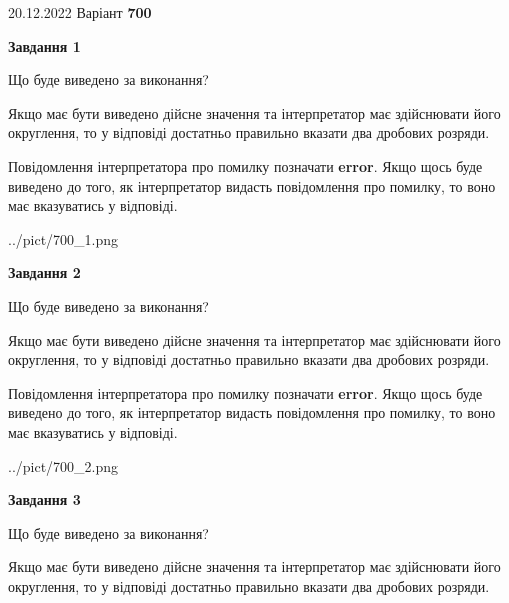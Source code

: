 \documentclass[12pt, ukrainian]{article}
\begin{document}
{20.12.2022 Варіант \No \textbf { 700 }\par}
{
\begin {Large}

{\begin {center}\textbf{Завдання 1}\end {center}}\par
Що буде виведено за виконання? \par

Якщо має бути виведено дійсне значення та інтерпретатор має здійснювати його округлення, 
то у відповіді достатньо правильно вказати два дробових розряди.

Повідомлення інтерпретатора про помилку позначати \textbf{error}.
Якщо щось буде виведено до того, як інтерпретатор видасть повідомлення про помилку, 
то воно має вказуватись у відповіді. \par

\begin{center}
	{../pict/700_1.png}
\end{center}
\newpage

{\begin {center}\textbf{Завдання 2}\end {center}}\par
Що буде виведено за виконання? \par

Якщо має бути виведено дійсне значення та інтерпретатор має здійснювати його округлення, 
то у відповіді достатньо правильно вказати два дробових розряди.

Повідомлення інтерпретатора про помилку позначати \textbf{error}.
Якщо щось буде виведено до того, як інтерпретатор видасть повідомлення про помилку, 
то воно має вказуватись у відповіді. \par

\begin{center}
	{../pict/700_2.png}
\end{center}
\newpage

{\begin {center}\textbf{Завдання 3}\end {center}}\par
Що буде виведено за виконання? \par

Якщо має бути виведено дійсне значення та інтерпретатор має здійснювати його округлення, 
то у відповіді достатньо правильно вказати два дробових розряди.


\end{Large}}
\end{document}
